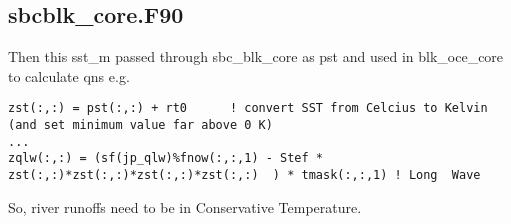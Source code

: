 \documentclass{article}
\begin{document}
\subsection*{sbcblk\_core.F90}
Then this sst\_m passed through sbc\_blk\_core as pst and used in blk\_oce\_core to calculate qns e.g.
\begin{verbatim}
zst(:,:) = pst(:,:) + rt0      ! convert SST from Celcius to Kelvin (and set minimum value far above 0 K)
...
zqlw(:,:) = (sf(jp_qlw)%fnow(:,:,1) - Stef * zst(:,:)*zst(:,:)*zst(:,:)*zst(:,:)  ) * tmask(:,:,1) ! Long  Wave
\end{verbatim}

So, river runoffs need to be in Conservative Temperature.
\end{document}
